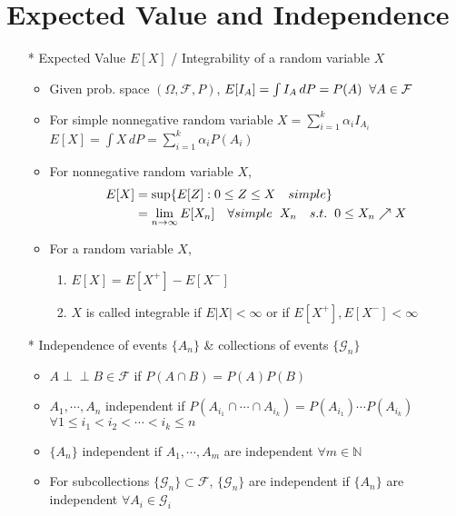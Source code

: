 \documentclass[12pt, A4]{article}
\newcommand{\indep}{\perp \!\!\! \perp}
\begin{document}
\section{Expected Value and Independence}
\begin{itemize}
	\item[*] Expected Value $E[X]$ / Integrability of a random variable $X$
	\begin{itemize}
		\item Given prob. space $(\Omega, \mathcal{F}, P)$, \quad $E[I_A]=\int I_A\, dP= P(A) \hspace{0.2cm} \forall A\in \mathcal{F}$
		\item For simple nonnegative random variable $X=\sum_{i=1}^{k}\alpha_iI_{A_i}$
		\\ $E[X]=\int X\, dP= \sum_{i=1}^{k}\alpha_iP(A_i)$
		\item For nonnegative random variable $X$, 
		\begin{equation*}
			\begin{split}
				E[X] &=\sup\{E[Z] : 0\leq Z\leq X \quad simple\} \\
				&=\lim_{n \to \infty}E[X_n]\quad  \forall simple\hspace{0.2cm} X_n\quad  s.t. \hspace{0.2cm} 0\leq X_n\nearrow X
			\end{split}
		\end{equation*}
		\item For a random variable $X$, 
		\begin{enumerate}
			\item $E[X]=E[X^+]-E[X^-]$
			\item $X$ is called integrable if $E|X|<\infty$ or if $E[X^+], E[X^-]<\infty$
		\end{enumerate}
		\end{itemize}
	\item[*] Independence of events $\{A_n\}$ \& collections of events $\{\mathcal{G}_n\}$
	\begin{itemize}
		\item $A\indep B\in \mathcal{F}$ if $P(A\cap B)=P(A)P(B)$ 
		\item $A_1,\cdots,A_n$ independent if $P(A_{i_1}\cap\cdots\cap A_{i_k})=P(A_{i_1})\cdots P(A_{i_k})$ \\ $\forall 1\leq i_1<i_2<\cdots<i_k\leq n$
		\item $\{A_n\}$ independent if $A_1,\cdots, A_m$ are independent $\forall m\in \mathbb{N}$
		\item For subcollections $\{\mathcal{G}_n\}\subset \mathcal{F} $, $\{\mathcal{G}_n\}$ are independent if $\{A_n\}$ are independent $\forall A_i\in \mathcal{G}_i $

\end{itemize}
\end{itemize}
\end{document}

